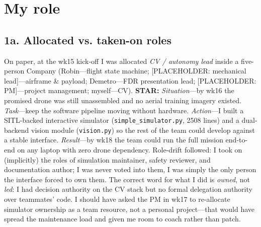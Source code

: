 \section{My role}

\subsection*{1a. Allocated vs. taken-on roles }
\www On paper, at the wk15 kick-off I was allocated \emph{CV / autonomy lead} inside a five-person Company (Robin---flight state machine; [PLACEHOLDER: mechanical lead]---airframe \& payload; Demetro---FDR presentation lead; [PLACEHOLDER: PM]---project management; myself---CV). \textbf{STAR:} \emph{Situation}---by wk16 the promised drone was still unassembled and no aerial training imagery existed. \emph{Task}---keep the software pipeline moving without hardware. \emph{Action}---I built a SITL-backed interactive simulator (\texttt{simple\_simulator.py}, 2508 lines) and a dual-backend vision module (\texttt{vision.py}) so the rest of the team could develop against a stable interface. \emph{Result}---by wk18 the team could run the full mission end-to-end on any laptop with zero drone dependency. Role-drift followed: I took on (implicitly) the roles of simulation maintainer, safety reviewer, and documentation author; I was never voted into them, I was simply the only person the interface forced to own them.
\ebi The correct word for what I did is \emph{owned}, not \emph{led}: I had decision authority on the CV stack but no formal delegation authority over teammates' code. I should have asked the PM in wk17 to re-allocate simulator ownership as a team resource, not a personal project---that would have spread the maintenance load and given me room to coach rather than patch.

